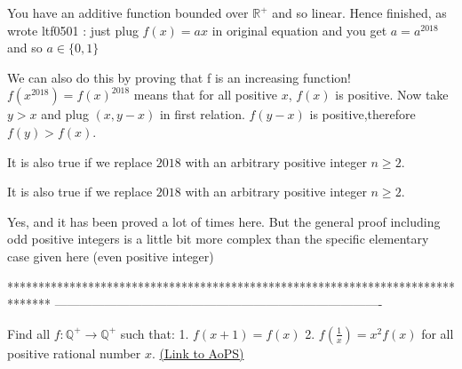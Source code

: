 \begin{solution}
	You have an additive function bounded over $\mathbb R^+$ and so linear.
Hence finished, as wrote ltf0501 : just plug $f(x)=ax$ in original equation and you get $a=a^{2018}$ and so $a\in\{0,1\}$

\end{solution}



\begin{solution}
	We can also do this by proving that f is an increasing function!
$f(x^{2018})=f(x)^{2018}$ means that for all positive $x $, $f(x) $ is positive.
Now take $y>x $ and plug $(x,y-x) $ in first relation. $f(y-x) $ is positive,therefore $f(y)>f(x) $.
\end{solution}



\begin{solution}
	It is also true if we replace $2018$ with an arbitrary positive integer $n \geq 2$.
\end{solution}



\begin{solution}
	\begin{tcolorbox}It is also true if we replace $2018$ with an arbitrary positive integer $n \geq 2$.\end{tcolorbox}

Yes, and it has been proved a lot of times here. But the general proof including odd positive integers is a little bit more complex than the specific elementary case given here (even positive integer)
\end{solution}
*******************************************************************************
-------------------------------------------------------------------------------

\begin{problem}
	Find all $f:\mathbb{Q}^+\rightarrow \mathbb{Q}^+$ such that:
1. $f(x+1)=f(x)$
2. $f(\frac{1}{x})=x^2f(x)$
for all positive rational number $x$.
	\flushright \href{https://artofproblemsolving.com/community/c6h1608160}{(Link to AoPS)}
\end{problem}



